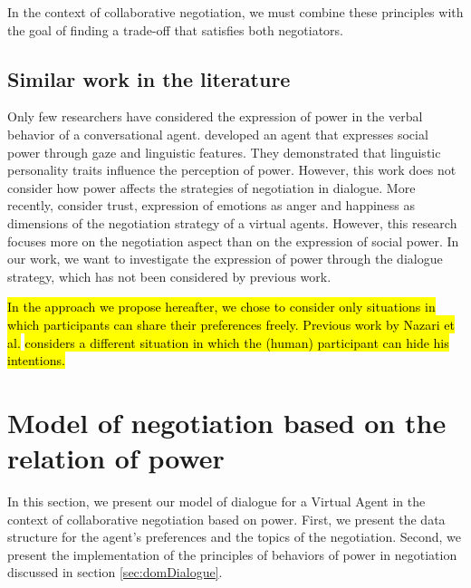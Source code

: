 \documentclass{llncs}
\begin{document}
		In the context of collaborative negotiation, we must combine these principles with the goal of finding a trade-off that satisfies both negotiators.

		
		\subsection{Similar work in the literature}
		Only few researchers have considered the expression of power in the verbal behavior of a conversational agent. \cite{bee2010bossy} developed an agent that expresses social power through gaze and linguistic features. They demonstrated that linguistic personality traits influence the perception of power. However, this work does not consider how power affects the strategies of negotiation in dialogue. More recently, \cite{broekens2010affective,de2015humans} consider trust, expression of emotions as anger and happiness as dimensions of the negotiation strategy of a virtual agents. However, this research focuses more on the negotiation aspect than on the expression of social power. In our work, we want to investigate the expression of power through the dialogue strategy, which has not been considered by previous work.
		
		\hl{In the approach we propose hereafter, we chose to consider only situations in which participants can share their preferences freely. Previous work by Nazari et al. }\cite{nazari2015} \hl{considers a different situation in which the (human) participant can hide his intentions.}
		
		\section{Model of negotiation based on the relation of power}
		In this section, we present our model of dialogue for a Virtual Agent  in the context of collaborative negotiation based on power.	
		First, we present the data structure for the agent's preferences and the topics of the negotiation. Second, we present the implementation of the principles of behaviors of power in negotiation discussed in section \ref{sec:domDialogue}.
		\vspace{-1em} 
\end{document}

